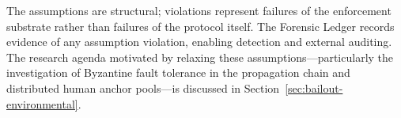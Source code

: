 The assumptions are structural; violations represent failures of the
enforcement substrate rather than failures of the protocol itself.  The
Forensic Ledger records evidence of any assumption violation, enabling
detection and external auditing.  The research agenda motivated by relaxing
these assumptions---particularly the investigation of Byzantine fault
tolerance in the propagation chain and distributed human anchor pools---is
discussed in Section~\ref{sec:bailout-environmental}.